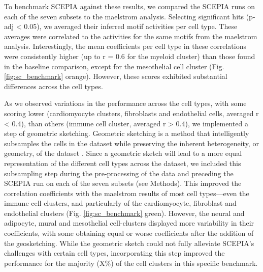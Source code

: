 To benchmark SCEPIA against these results, we compared the SCEPIA runs on each of the seven subsets to the maelstrom analysis. Selecting significant hits (p-adj < 0.05), we averaged their inferred motif activities per cell type. These averages were correlated to the activities for the same motifs from the maelstrom analysis. Interestingly, the mean coefficients per cell type in these correlations were consistently higher (up to r = 0.6 for the myeloid cluster) than those found in the baseline comparison, except for the mesothelial cell cluster (Fig. \ref{fig:sc_benchmark} orange). However, these scores exhibited substantial differences across the cell types.

As we observed variations in the performance across the cell types, with some scoring lower (cardiomyocyte clusters, fibroblasts and endothelial cells, averaged r < 0.4), than others (immune cell cluster, averaged r > 0.4), we implemented a step of geometric sketching. Geometric sketching is a method that intelligently subsamples the cells in the dataset while preserving the inherent heterogeneity, or geometry, of the dataset \cite{Hie2019}. Since a geometric sketch will lead to a more equal representation of the different cell types across the dataset, we included this subsampling step during the pre-processing of the data and preceding the SCEPIA run on each of the seven subsets (see Methods). This improved the correlation coefficients with the maelstrom results of most cell types—even the immune cell clusters, and particularly of the cardiomyocyte, fibroblast and endothelial clusters (Fig. \ref{fig:sc_benchmark} green). However, the neural and adipocyte, mural and mesothelial cell-clusters displayed more variability in their coefficients, with some obtaining equal or worse coefficients after the addition of the geosketching. While the geometric sketch could not fully alleviate SCEPIA's challenges with certain cell types, incorporating this step improved the performance for the majority (X\%) of the cell clusters in this specific benchmark. 

